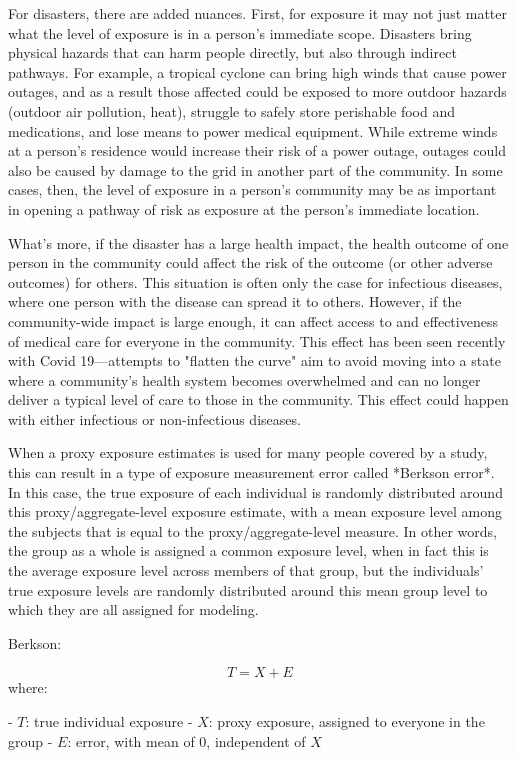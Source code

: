 For disasters, there are added nuances. First, for exposure it may not just 
matter what the level of exposure is in a person's immediate scope. Disasters
bring physical hazards that can harm people directly, but also through indirect
pathways. For example, a tropical cyclone can bring high winds that cause 
power outages, and as a result those affected could be exposed to more outdoor
hazards (outdoor air pollution, heat), struggle to safely store perishable
food and medications, and lose means to power medical equipment. While extreme
winds at a person's residence would increase their risk of a power outage, 
outages could also be caused by damage to the grid in another part of the 
community. In some cases, then, the level of exposure in a person's community
may be as important in opening a pathway of risk as exposure at the person's
immediate location. 

What's more, if the disaster has a large health impact, the health outcome of
one person in the community could affect the risk of the outcome (or other
adverse outcomes) for others. This situation is often only the case for 
infectious diseases, where one person with the disease can spread it to others.
However, if the community-wide impact is large enough, it can affect access
to and effectiveness of medical care for everyone in the community. This
effect has been seen recently with Covid 19---attempts to "flatten the curve"
aim to avoid moving into a state where a community's health system becomes
overwhelmed and can no longer deliver a typical level of care to those in the
community. This effect could happen with either infectious or non-infectious
diseases.

When a proxy exposure estimates is used for many people covered by a study, this
can result in a type of exposure measurement error called *Berkson error*. In
this case, the true exposure of each individual is randomly distributed around
this proxy/aggregate-level exposure estimate, with a mean exposure level among
the subjects that is equal to the proxy/aggregate-level measure. In other words,
the group as a whole is assigned a common exposure level, when in fact this is
the average exposure level across members of that group, but the individuals'
true exposure levels are randomly distributed around this mean group level to
which they are all assigned for modeling.

Berkson: 

$$
T = X + E
$$
where: 

- $T$: true individual exposure
- $X$: proxy exposure, assigned to everyone in the group
- $E$: error, with mean of 0, independent of $X$

